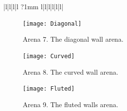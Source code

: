 \documentclass[a4paper,12pt,twoside,openright]{article}
\begin{document}
\begin{center}
\begin{table}
\begin{tabular}{|l|l|l|l ?{1mm} l|l|l|l|l|l|}
   \end{tabular}
   \caption{The results for the behavioural experiments conducted on the optical flow system; for these, arenas were designed to
     elicit a certain behavioural response, however, they mostly failed to do so, highlighting problems with the current implementation
     and methods of experimentation. The ``As expected'' column denotes cases whether the robot performed the expected moves: No means
     not at all, Almost means that movements were initially correct then went wrong, and Yes means complete success.
    }
    \label{tab:ofrestwo}
  \end{table}
\end{center}

\begin{figure}
  \centering
  \texttt{[image: Diagonal]}
  \caption{
    \label{fig:diag} Arena 7. The diagonal wall arena.
  }
\end{figure}

\begin{figure}
  \centering
  \texttt{[image: Curved]}
  \caption{
    \label{fig:curved} Arena 8. The curved wall arena.
  }
\end{figure}

\begin{figure}
  \centering
  \texttt{[image: Fluted]}
  \caption{
    \label{fig:fluted} Arena 9. The fluted walls arena.
  }
\end{figure}
\end{document}
